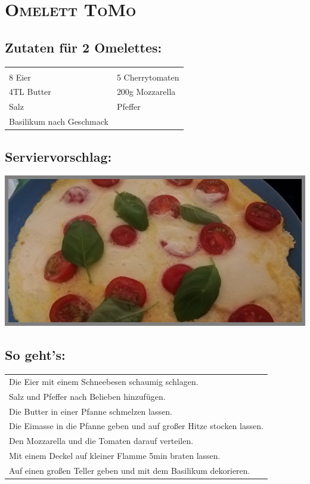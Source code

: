 \section{\textsc{Omelett ToMo}}

\subsection*{Zutaten für 2 Omelettes:}

\begin{tabular}{p{7.5cm} p{7.5cm}}
	& \\
	8 Eier & 5 Cherrytomaten \\
	4TL Butter & 200g Mozzarella \\
	Salz & Pfeffer \\
	Basilikum nach Geschmack &
\end{tabular}

\subsection*{Serviervorschlag:}

\includegraphics[width=\textwidth]{img/omlett_tomo.jpg} \cite{omlettomo}

\subsection*{So geht's:}

\begin{tabular}{p{15cm}}
	\\
	Die Eier mit einem Schneebesen schaumig schlagen.\\
	Salz und Pfeffer nach Belieben hinzufügen.\\
	Die Butter in einer Pfanne schmelzen lassen.\\
	Die Eimasse in die Pfanne geben und auf großer Hitze stocken lassen.\\
	Den Mozzarella und die Tomaten darauf verteilen.\\
	Mit einem Deckel auf kleiner Flamme 5min braten lassen.\\
	Auf einen großen Teller geben und mit dem Basilikum dekorieren.\\
\end{tabular}
